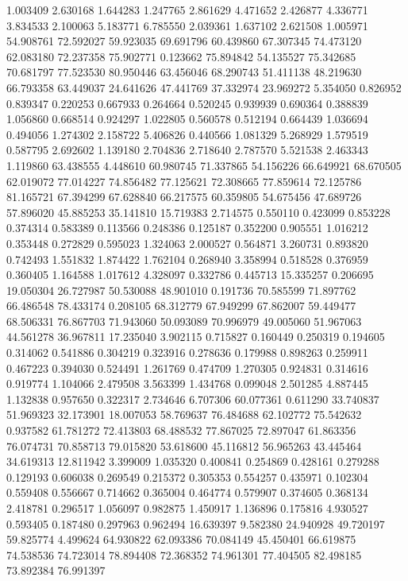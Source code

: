 1.003409
2.630168
1.644283
1.247765
2.861629
4.471652
2.426877
4.336771
3.834533
2.100063
5.183771
6.785550
2.039361
1.637102
2.621508
1.005971
54.908761
72.592027
59.923035
69.691796
60.439860
67.307345
74.473120
62.083180
72.237358
75.902771
0.123662
75.894842
54.135527
75.342685
70.681797
77.523530
80.950446
63.456046
68.290743
51.411138
48.219630
66.793358
63.449037
24.641626
47.441769
37.332974
23.969272
5.354050
0.826952
0.839347
0.220253
0.667933
0.264664
0.520245
0.939939
0.690364
0.388839
1.056860
0.668514
0.924297
1.022805
0.560578
0.512194
0.664439
1.036694
0.494056
1.274302
2.158722
5.406826
0.440566
1.081329
5.268929
1.579519
0.587795
2.692602
1.139180
2.704836
2.718640
2.787570
5.521538
2.463343
1.119860
63.438555
4.448610
60.980745
71.337865
54.156226
66.649921
68.670505
62.019072
77.014227
74.856482
77.125621
72.308665
77.859614
72.125786
81.165721
67.394299
67.628840
66.217575
60.359805
54.675456
47.689726
57.896020
45.885253
35.141810
15.719383
2.714575
0.550110
0.423099
0.853228
0.374314
0.583389
0.113566
0.248386
0.125187
0.352200
0.905551
1.016212
0.353448
0.272829
0.595023
1.324063
2.000527
0.564871
3.260731
0.893820
0.742493
1.551832
1.874422
1.762104
0.268940
3.358994
0.518528
0.376959
0.360405
1.164588
1.017612
4.328097
0.332786
0.445713
15.335257
0.206695
19.050304
26.727987
50.530088
48.901010
0.191736
70.585599
71.897762
66.486548
78.433174
0.208105
68.312779
67.949299
67.862007
59.449477
68.506331
76.867703
71.943060
50.093089
70.996979
49.005060
51.967063
44.561278
36.967811
17.235040
3.902115
0.715827
0.160449
0.250319
0.194605
0.314062
0.541886
0.304219
0.323916
0.278636
0.179988
0.898263
0.259911
0.467223
0.394030
0.524491
1.261769
0.474709
1.270305
0.924831
0.314616
0.919774
1.104066
2.479508
3.563399
1.434768
0.099048
2.501285
4.887445
1.132838
0.957650
0.322317
2.734646
6.707306
60.077361
0.611290
33.740837
51.969323
32.173901
18.007053
58.769637
76.484688
62.102772
75.542632
0.937582
61.781272
72.413803
68.488532
77.867025
72.897047
61.863356
76.074731
70.858713
79.015820
53.618600
45.116812
56.965263
43.445464
34.619313
12.811942
3.399009
1.035320
0.400841
0.254869
0.428161
0.279288
0.129193
0.606038
0.269549
0.215372
0.305353
0.554257
0.435971
0.102304
0.559408
0.556667
0.714662
0.365004
0.464774
0.579907
0.374605
0.368134
2.418781
0.296517
1.056097
0.982875
1.450917
1.136896
0.175816
4.930527
0.593405
0.187480
0.297963
0.962494
16.639397
9.582380
24.940928
49.720197
59.825774
4.499624
64.930822
62.093386
70.084149
45.450401
66.619875
74.538536
74.723014
78.894408
72.368352
74.961301
77.404505
82.498185
73.892384
76.991397
